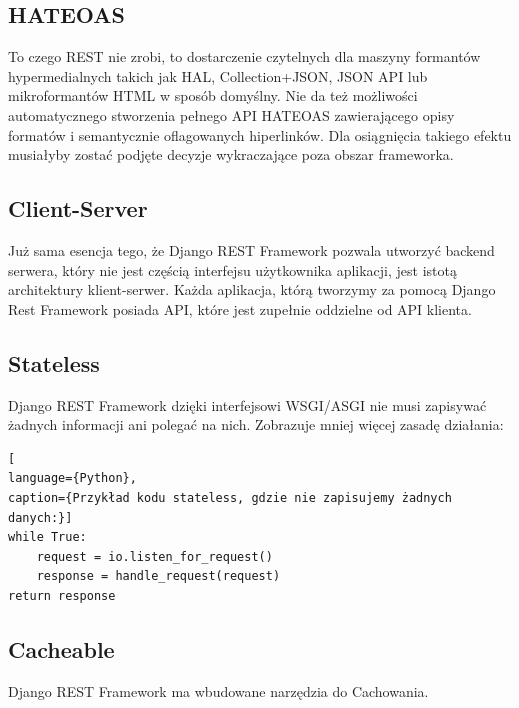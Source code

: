\documentclass[oneside,polski,logo,indent]{amuthesis}
\begin{document}
\begin{center}
\subsection{HATEOAS}
\end{center}
To czego REST nie zrobi, to dostarczenie czytelnych dla maszyny formantów hypermedialnych takich jak HAL, Collection+JSON, JSON API lub mikroformantów HTML w sposób domyślny. Nie da też możliwości automatycznego stworzenia pełnego API HATEOAS zawierającego opisy formatów i semantycznie oflagowanych hiperlinków. Dla osiągnięcia takiego efektu musiałyby zostać podjęte decyzje wykraczające poza obszar frameworka. 


\begin{center}
\subsection{Client-Server}
\end{center}
Już sama esencja tego, że Django REST Framework pozwala utworzyć backend serwera, który nie jest częścią interfejsu użytkownika aplikacji, jest istotą architektury klient-serwer. Każda aplikacja, którą tworzymy za pomocą Django Rest Framework posiada API, które jest zupełnie oddzielne od API klienta. 

\begin{center}
\subsection{Stateless}
\end{center}
Django REST Framework dzięki interfejsowi WSGI/ASGI nie musi zapisywać żadnych informacji ani polegać na nich. Zobrazuje mniej więcej zasadę działania:


\begin{lstlisting}[
language={Python},
caption={Przykład kodu stateless, gdzie nie zapisujemy żadnych danych:}]
while True:
    request = io.listen_for_request()
    response = handle_request(request)
return response
\end{lstlisting}

\begin{center}
\subsection{Cacheable}
\end{center}
Django REST Framework ma wbudowane narzędzia do Cachowania.
\end{document}
